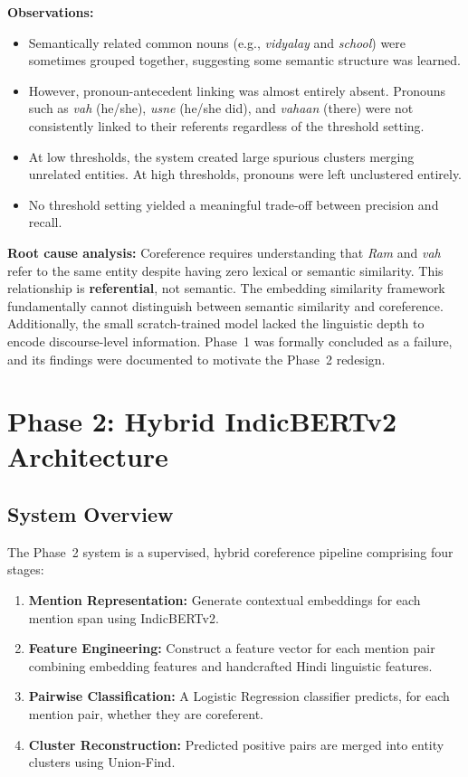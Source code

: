 \documentclass[12pt,a4paper]{report}
\begin{document}
\textbf{Observations:}
\begin{itemize}
    \item Semantically related common nouns (e.g., \textit{vidyalay} and \textit{school}) were sometimes grouped together, suggesting some semantic structure was learned.
    \item However, pronoun-antecedent linking was almost entirely absent. Pronouns such as \textit{vah} (he/she), \textit{usne} (he/she did), and \textit{vahaan} (there) were not consistently linked to their referents regardless of the threshold setting.
    \item At low thresholds, the system created large spurious clusters merging unrelated entities. At high thresholds, pronouns were left unclustered entirely.
    \item No threshold setting yielded a meaningful trade-off between precision and recall.
\end{itemize}

\textbf{Root cause analysis:}
Coreference requires understanding that \textit{Ram} and \textit{vah} refer to the same entity despite having zero lexical or semantic similarity. This relationship is \textbf{referential}, not semantic. The embedding similarity framework fundamentally cannot distinguish between semantic similarity and coreference. Additionally, the small scratch-trained model lacked the linguistic depth to encode discourse-level information. Phase~1 was formally concluded as a failure, and its findings were documented to motivate the Phase~2 redesign.

\section{Phase 2: Hybrid IndicBERTv2 Architecture}

\subsection{System Overview}

The Phase~2 system is a supervised, hybrid coreference pipeline comprising four stages:

\begin{enumerate}
    \item \textbf{Mention Representation:} Generate contextual embeddings for each mention span using IndicBERTv2.
    \item \textbf{Feature Engineering:} Construct a feature vector for each mention pair combining embedding features and handcrafted Hindi linguistic features.
    \item \textbf{Pairwise Classification:} A Logistic Regression classifier predicts, for each mention pair, whether they are coreferent.
    \item \textbf{Cluster Reconstruction:} Predicted positive pairs are merged into entity clusters using Union-Find.
\end{enumerate}
\end{document}

